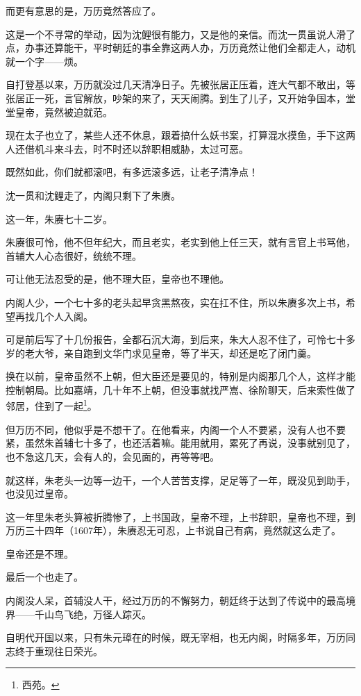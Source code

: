 \begin{multicols}{\theparacolNo}
		而更有意思的是，万历竟然答应了。

		这是一个不寻常的举动，因为沈鲤很有能力，又是他的亲信。而沈一贯虽说人滑了点，办事还算能干，平时朝廷的事全靠这两人办，万历竟然让他们全都走人，动机就一个字——烦。

		自打登基以来，万历就没过几天清净日子。先被张居正压着，连大气都不敢出，等张居正一死，言官解放，吵架的来了，天天闹腾。到生了儿子，又开始争国本，堂堂皇帝，竟然被迫就范。

		现在太子也立了，某些人还不休息，跟着搞什么妖书案，打算混水摸鱼，手下这两人还借机斗来斗去，时不时还以辞职相威胁，太过可恶。

		既然如此，你们就都滚吧，有多远滚多远，让老子清净点！

		沈一贯和沈鲤走了，内阁只剩下了朱赓。

		这一年，朱赓七十二岁。

		朱赓很可怜，他不但年纪大，而且老实，老实到他上任三天，就有言官上书骂他，首辅大人心态很好，统统不理。

		可让他无法忍受的是，他不理大臣，皇帝也不理他。

		内阁人少，一个七十多的老头起早贪黑熬夜，实在扛不住，所以朱赓多次上书，希望再找几个人入阁。

		可是前后写了十几份报告，全都石沉大海，到后来，朱大人忍不住了，可怜七十多岁的老大爷，亲自跑到文华门求见皇帝，等了半天，却还是吃了闭门羹。

		换在以前，皇帝虽然不上朝，但大臣还是要见的，特别是内阁那几个人，这样才能控制朝局。比如嘉靖，几十年不上朝，但没事就找严嵩、徐阶聊天，后来索性做了邻居，住到了一起\footnote{西苑。}。

		但万历不同，他似乎是不想干了。在他看来，内阁一个人不要紧，没有人也不要紧，虽然朱首辅七十多了，也还活着嘛。能用就用，累死了再说，没事就别见了，也不急这几天，会有人的，会见面的，再等等吧。

		就这样，朱老头一边等一边干，一个人苦苦支撑，足足等了一年，既没见到助手，也没见过皇帝。

		这一年里朱老头算被折腾惨了，上书国政，皇帝不理，上书辞职，皇帝也不理，到万历三十四年（1607年），朱赓忍无可忍，上书说自己有病，竟然就这么走了。

		皇帝还是不理。

		最后一个也走了。

		内阁没人呆，首辅没人干，经过万历的不懈努力，朝廷终于达到了传说中的最高境界——千山鸟飞绝，万径人踪灭。

		自明代开国以来，只有朱元璋在的时候，既无宰相，也无内阁，时隔多年，万历同志终于重现往日荣光。


\end{multicols}
